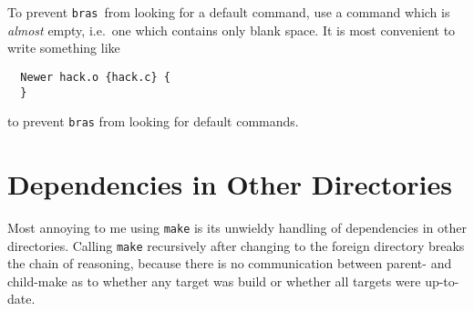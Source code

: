 \documentclass[12pt]{article}
\newcommand{\bras}{\texttt{bras}}
\newcommand{\make}{\texttt{make}}
\begin{document}
To prevent \bras\ from looking for a default command, use a command
which is \textit{almost} empty, i.e.\ one which contains only blank
space. It is most convenient to write something like
\begin{verbatim}
  Newer hack.o {hack.c} {
  }
\end{verbatim}
to prevent \bras{} from looking for default commands.

\section{Dependencies in Other Directories}

Most annoying to me using \make{} is its unwieldy handling of
dependencies in other directories. Calling \make{}
recursively after changing to the foreign directory
breaks the chain of reasoning, because there is no communication
between parent- and child-make as to whether any target was build or
whether all targets were up-to-date.
\end{document}
